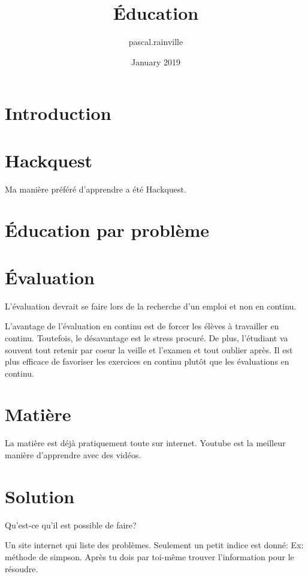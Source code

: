 \documentclass{article}
\title{Éducation}
\author{pascal.rainville }
\date{January 2019}
\begin{document}
\makecustomtitle

\section{Introduction}

\section{Hackquest}

Ma manière préféré d'apprendre a été Hackquest.

\section{Éducation par problème}


\section{Évaluation}

L'évaluation devrait se faire lors de la recherche d'un emploi et non en continu.

L'avantage de l'évaluation en continu est de forcer les élèves à travailler en continu. Toutefois, le désavantage est le stress procuré. De plus, l'étudiant va souvent tout retenir par coeur la veille et l'examen et tout oublier après. Il est plus efficace de favoriser les exercices en continu plutôt que les évaluations en continu.

\section{Matière}

La matière est déjà pratiquement toute sur internet. Youtube est la meilleur manière d'apprendre avec des vidéos.

\section{Solution}

Qu'est-ce qu'il est possible de faire?

Un site internet qui liste des problèmes. Seulement un petit indice est donné: Ex: méthode de simpson. Après tu dois par toi-même trouver l'information pour le résoudre.
\end{document}
